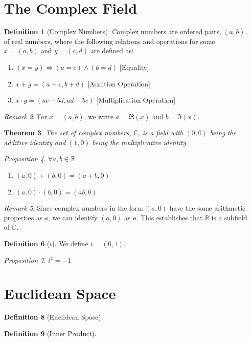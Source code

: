 \documentclass[a4paper,12pt]{report}
\newcommand{\R}{\mathbb{R}}
\newcommand{\C}{\mathbb{C}}
\theoremstyle{plain}
\newtheorem{theorem}{\color{blue}Theorem}[chapter] %
\theoremstyle{definition}
\newtheorem{definition}[theorem]{\color{red}Definition} %
\theoremstyle{remark}
\newtheorem{remark}[theorem]{\color{ForestGreen}Remark} %
\newtheorem{proposition}[theorem]{\color{Brown}Proposition} %
\begin{document}
\section{The Complex Field}
\begin{definition}[Complex Numbers]
Complex numbers are ordered pairs, $(a,b)$, of real numbers, where the following relations and operations for some $x=(a,b)$ and $y=(c,d)$ are defined as:
\begin{enumerate}
\item $(x=y)\iff (a=c)\wedge(b=d)$ [Equality]
\item $x+y=(a+c,b+d)$ [Addition Operation]
\item $x\cdot y=(ac-bd, ad+bc)$ [Multiplication Operation]
\end{enumerate}
\end{definition}
\begin{remark}
For $x=(a,b)$, we write $a=\Re(x)$ and $b=\Im(x)$.
\end{remark}
\begin{theorem}
The set of complex numbers, $\C$, is a field with $(0,0)$ being the additive identity and $(1,0)$ being the multiplicative identity.
\end{theorem}
\begin{proposition}
$\forall a,b\in\R$
\begin{enumerate}
\item $(a,0)+(b,0)=(a+b,0)$
\item $(a,0)\cdot(b,0)=(ab,0)$
\end{enumerate}
\end{proposition}
\begin{remark}
Since complex numbers in the form $(a,0)$ have the same arithmetic properties as $a$, we can identify $(a,0)$ as $a$. This establishes that $\R$ is a subfield of $\C$.
\end{remark}
\begin{definition}[$i$]
We define $i=(0,1)$.
\end{definition}
\begin{proposition}
$i^2=-1$
\end{proposition}

\section{Euclidean Space}
\begin{definition}[Euclidean Space]
\end{definition}

\begin{definition}[Inner Product]
\end{definition}
\end{document}
